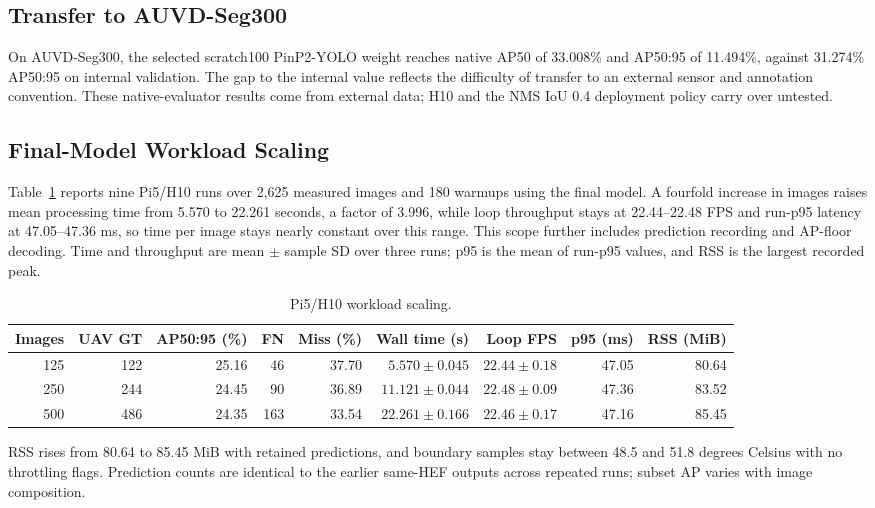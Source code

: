 \documentclass[lettersize,journal]{IEEEtran}
\begin{document}
\subsection{Transfer to AUVD-Seg300}
On AUVD-Seg300, the selected scratch100 PinP2-YOLO weight reaches native AP50 of 33.008\% and AP50:95 of 11.494\%, against 31.274\% AP50:95 on internal validation. The gap to the internal value reflects the difficulty of transfer to an external sensor and annotation convention. These native-evaluator results come from external data; H10 and the NMS IoU 0.4 deployment policy carry over untested.

\subsection{Final-Model Workload Scaling}
Table~\ref{tab:scaling} reports nine Pi5/H10 runs over 2,625 measured images and 180 warmups using the final model. A fourfold increase in images raises mean processing time from 5.570 to 22.261 seconds, a factor of 3.996, while loop throughput stays at 22.44--22.48 FPS and run-p95 latency at 47.05--47.36 ms, so time per image stays nearly constant over this range. This scope further includes prediction recording and AP-floor decoding. Time and throughput are mean $\pm$ sample SD over three runs; p95 is the mean of run-p95 values, and RSS is the largest recorded peak.
\begin{table}[!t]
\caption{Pi5/H10 workload scaling.}
\label{tab:scaling}
\centering\footnotesize
\setlength{\tabcolsep}{4pt}
\begin{tabular}{rrrrrrrrr}
\hline
Images & UAV GT & AP50:95 (\%) & FN & Miss (\%) & Wall time (s) & Loop FPS & p95 (ms) & RSS (MiB)\\
\hline
125 & 122 & 25.16 & 46 & 37.70 & $5.570\pm0.045$ & $22.44\pm0.18$ & 47.05 & 80.64\\
250 & 244 & 24.45 & 90 & 36.89 & $11.121\pm0.044$ & $22.48\pm0.09$ & 47.36 & 83.52\\
500 & 486 & 24.35 & 163 & 33.54 & $22.261\pm0.166$ & $22.46\pm0.17$ & 47.16 & 85.45\\
\hline
\end{tabular}
\end{table}

RSS rises from 80.64 to 85.45 MiB with retained predictions, and boundary samples stay between 48.5 and 51.8 degrees Celsius with no throttling flags. Prediction counts are identical to the earlier same-HEF outputs across repeated runs; subset AP varies with image composition.
\end{document}
